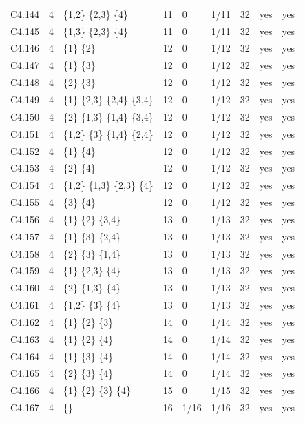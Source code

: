 {\begin{longtable}{@{}llp{6.2cm}rllrll@{}}
C4.144 & 4 & \{1,2\} \{2,3\} \{4\} & 11 & 0 & 1/11 & 32 & yes & yes \\
C4.145 & 4 & \{1,3\} \{2,3\} \{4\} & 11 & 0 & 1/11 & 32 & yes & yes \\
C4.146 & 4 & \{1\} \{2\} & 12 & 0 & 1/12 & 32 & yes & yes \\
C4.147 & 4 & \{1\} \{3\} & 12 & 0 & 1/12 & 32 & yes & yes \\
C4.148 & 4 & \{2\} \{3\} & 12 & 0 & 1/12 & 32 & yes & yes \\
C4.149 & 4 & \{1\} \{2,3\} \{2,4\} \{3,4\} & 12 & 0 & 1/12 & 32 & yes & yes \\
C4.150 & 4 & \{2\} \{1,3\} \{1,4\} \{3,4\} & 12 & 0 & 1/12 & 32 & yes & yes \\
C4.151 & 4 & \{1,2\} \{3\} \{1,4\} \{2,4\} & 12 & 0 & 1/12 & 32 & yes & yes \\
C4.152 & 4 & \{1\} \{4\} & 12 & 0 & 1/12 & 32 & yes & yes \\
C4.153 & 4 & \{2\} \{4\} & 12 & 0 & 1/12 & 32 & yes & yes \\
C4.154 & 4 & \{1,2\} \{1,3\} \{2,3\} \{4\} & 12 & 0 & 1/12 & 32 & yes & yes \\
C4.155 & 4 & \{3\} \{4\} & 12 & 0 & 1/12 & 32 & yes & yes \\
C4.156 & 4 & \{1\} \{2\} \{3,4\} & 13 & 0 & 1/13 & 32 & yes & yes \\
C4.157 & 4 & \{1\} \{3\} \{2,4\} & 13 & 0 & 1/13 & 32 & yes & yes \\
C4.158 & 4 & \{2\} \{3\} \{1,4\} & 13 & 0 & 1/13 & 32 & yes & yes \\
C4.159 & 4 & \{1\} \{2,3\} \{4\} & 13 & 0 & 1/13 & 32 & yes & yes \\
C4.160 & 4 & \{2\} \{1,3\} \{4\} & 13 & 0 & 1/13 & 32 & yes & yes \\
C4.161 & 4 & \{1,2\} \{3\} \{4\} & 13 & 0 & 1/13 & 32 & yes & yes \\
C4.162 & 4 & \{1\} \{2\} \{3\} & 14 & 0 & 1/14 & 32 & yes & yes \\
C4.163 & 4 & \{1\} \{2\} \{4\} & 14 & 0 & 1/14 & 32 & yes & yes \\
C4.164 & 4 & \{1\} \{3\} \{4\} & 14 & 0 & 1/14 & 32 & yes & yes \\
C4.165 & 4 & \{2\} \{3\} \{4\} & 14 & 0 & 1/14 & 32 & yes & yes \\
C4.166 & 4 & \{1\} \{2\} \{3\} \{4\} & 15 & 0 & 1/15 & 32 & yes & yes \\
C4.167 & 4 & \{\} & 16 & 1/16 & 1/16 & 32 & yes & yes \\
\end{longtable}}
